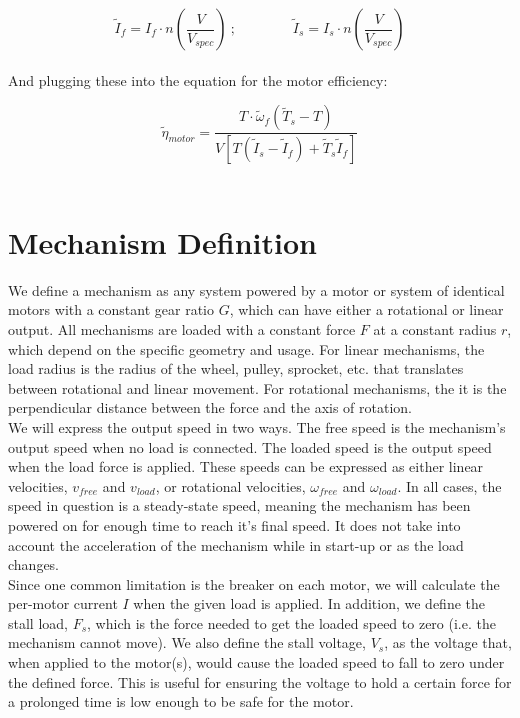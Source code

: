 \documentclass[a4paper]{article}
\begin{document}
	\begin{equation}
		\widetilde{I}_f = I_f \cdot n \left( \frac{V}{V_{spec}} \right)\ ; \qquad\qquad \widetilde{I}_s = I_s \cdot n \left( \frac{V}{V_{spec}} \right)
	\end{equation}\\
	
	And plugging these into the equation for the motor efficiency:
	
	\begin{equation}
		\widetilde{\eta}_{motor} = \frac{T \cdot \widetilde{\omega}_f \left( \widetilde{T}_s - T \right)}{V \left[ T \left( \widetilde{I}_s - \widetilde{I}_f \right) + \widetilde{T}_s \widetilde{I}_f \right]}
	\end{equation}\\
	
	
	\section{Mechanism Definition}
	
	We define a mechanism as any system powered by a motor or system of identical motors with a constant gear ratio $ G $, which can have either a rotational or linear output. All mechanisms are loaded with a constant force $ F $ at a constant radius $ r $, which depend on the specific geometry and usage. For linear mechanisms, the load radius is the radius of the wheel, pulley, sprocket, etc. that translates between rotational and linear movement. For rotational mechanisms, the it is the perpendicular distance between the force and the axis of rotation.\\
	
	We will express the output speed in two ways. The free speed is the mechanism's output speed when no load is connected. The loaded speed is the output speed when the load force is applied. These speeds can be expressed as either linear velocities, $ v_{free} $ and $ v_{load} $, or rotational velocities, $ \omega_{free} $ and $ \omega_{load} $. In all cases, the speed in question is a steady-state speed, meaning the mechanism has been powered on for enough time to reach it's final speed. It does not take into account the acceleration of the mechanism while in start-up or as the load changes.\\
	
	Since one common limitation is the breaker on each motor, we will calculate the per-motor current $ I $ when the given load is applied. In addition, we define the stall load, $ F_s $, which is the force needed to get the loaded speed to zero (i.e. the mechanism cannot move). We also define the stall voltage, $ V_s $, as the voltage that, when applied to the motor(s), would cause the loaded speed to fall to zero under the defined force. This is useful for ensuring the voltage to hold a certain force for a prolonged time is low enough to be safe for the motor.\\
	
\end{document}
